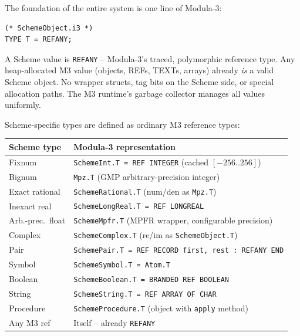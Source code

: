 \documentclass[
  12pt,
]{report}
\newcommand{\passthrough}[1]{#1}
\newcounter{none} %
\begin{document}
The foundation of the entire system is one line of Modula-3:

\begin{lstlisting}
(* SchemeObject.i3 *)
TYPE T = REFANY;
\end{lstlisting}

A Scheme value is \passthrough{\lstinline!REFANY!} -- Modula-3's traced,
polymorphic reference type. Any heap-allocated M3 value (objects, REFs,
TEXTs, arrays) already \emph{is} a valid Scheme object. No wrapper
structs, tag bits on the Scheme side, or special allocation paths. The
M3 runtime's garbage collector manages all values uniformly.

Scheme-specific types are defined as ordinary M3 reference types:

{\def\LTcaptype{none} %
\begin{longtable}[]{@{}
  >{\raggedright\arraybackslash}p{}
  >{\raggedright\arraybackslash}p{}@{}}
\toprule\noalign{}
\begin{minipage}[b]{\linewidth}\raggedright
Scheme type
\end{minipage} & \begin{minipage}[b]{\linewidth}\raggedright
Modula-3 representation
\end{minipage} \\
\midrule\noalign{}
\endhead
\bottomrule\noalign{}
\endlastfoot
Fixnum & \passthrough{\lstinline!SchemeInt.T = REF INTEGER!} (cached $[-256..256]$) \\
Bignum & \passthrough{\lstinline!Mpz.T!} (GMP arbitrary-precision integer) \\
Exact rational & \passthrough{\lstinline!SchemeRational.T!} (num/den as \passthrough{\lstinline!Mpz.T!}) \\
Inexact real & \passthrough{\lstinline!SchemeLongReal.T = REF LONGREAL!} \\
Arb.-prec.\ float & \passthrough{\lstinline!SchemeMpfr.T!} (MPFR wrapper, configurable precision) \\
Complex & \passthrough{\lstinline!SchemeComplex.T!} (re/im as \passthrough{\lstinline!SchemeObject.T!}) \\
Pair &
\passthrough{\lstinline!SchemePair.T = REF RECORD first, rest : REFANY END!} \\
Symbol & \passthrough{\lstinline!SchemeSymbol.T = Atom.T!} \\
Boolean &
\passthrough{\lstinline!SchemeBoolean.T = BRANDED REF BOOLEAN!} \\
String & \passthrough{\lstinline!SchemeString.T = REF ARRAY OF CHAR!} \\
Procedure & \passthrough{\lstinline!SchemeProcedure.T!} (object with
\passthrough{\lstinline!apply!} method) \\
Any M3 ref & Itself -- already \passthrough{\lstinline!REFANY!} \\
\end{longtable}
}
\end{document}
